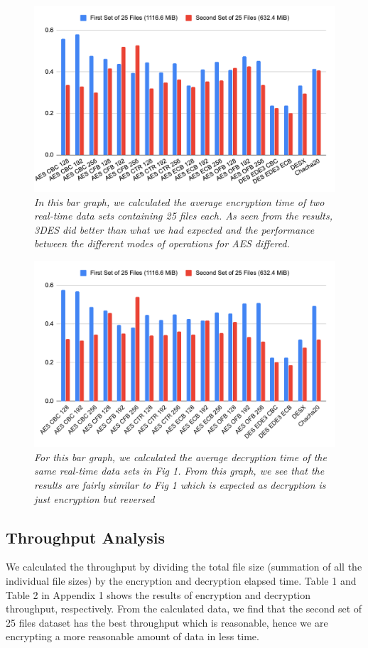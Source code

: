 \documentclass[conference]{IEEEtran}
\begin{document}
\FloatBarrier
\begin{figure}[htbp]
	\centerline{\includegraphics[scale=0.3]{fig1.png}}
	\caption{\textit{In this bar graph, we calculated the average encryption time of two real-time data sets containing 25 files each. As seen from the results, 3DES did better than what we had expected and the performance between the different modes of operations for AES differed.}}
	\label{fig1}
\end{figure}

\begin{figure}[htbp]
	\centerline{\includegraphics[scale=0.3]{fig2.png}}
	\caption{\textit{For this bar graph, we calculated the average decryption time of the same real-time data sets in Fig 1. From this graph, we see that the results are fairly similar to Fig 1 which is expected as decryption is just encryption but reversed}}
	\label{fig2}
\end{figure}
\FloatBarrier

\subsection{Throughput Analysis}
We calculated the throughput by dividing the total file size (summation of all the individual file sizes) by the encryption and decryption elapsed time. Table 1 and Table 2 in Appendix 1 shows the results of encryption and decryption throughput, respectively. From the calculated data, we find that the second set of 25 files dataset has the best throughput which is reasonable, hence we are encrypting a more reasonable amount of data in less time. 
\end{document}

